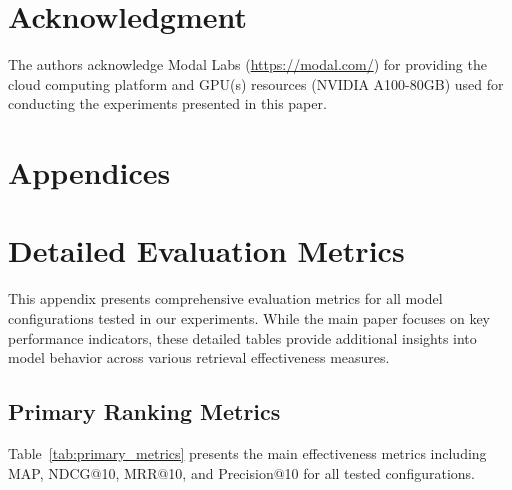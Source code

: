 \documentclass[conference]{IEEEtran}
\begin{document}
\section*{Acknowledgment}
The authors acknowledge Modal Labs (\url{https://modal.com/}) for providing the cloud computing platform and GPU(s) resources (NVIDIA A100-80GB) used for conducting the experiments presented in this paper.


 

\newpage
\appendix
\section*{Appendices}

\section{Detailed Evaluation Metrics}
\label{app:metrics}

This appendix presents comprehensive evaluation metrics for all model configurations tested in our experiments. While the main paper focuses on key performance indicators, these detailed tables provide additional insights into model behavior across various retrieval effectiveness measures.

\subsection{Primary Ranking Metrics}
Table~\ref{tab:primary_metrics} presents the main effectiveness metrics including MAP, NDCG@10, MRR@10, and Precision@10 for all tested configurations.
\end{document}

